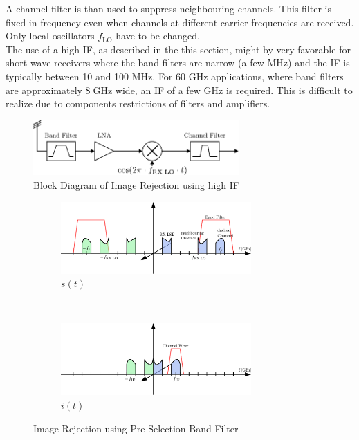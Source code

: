 A channel filter is than used to suppress neighbouring channels.
This filter is fixed in frequency even when channels at different carrier
frequencies are received. Only local oscillators $f_\text{LO}$ have to be
changed. \\

The use of a high \gls{IF}, as described in the this section, might
by very favorable for short wave receivers where the band filters
are narrow (a few MHz) and the \gls{IF} is typically between 10 and 100 MHz.
For 60 GHz applications, where band filters are approximately $8 \; \text{GHz}$
wide, an \gls{IF} of a few GHz is required.
This is difficult to realize due to components restrictions of filters
and amplifiers. \\

\begin{figure}[p]
  \centering
  \includegraphics[width=0.7\textwidth]{figures/rx_rf_0_bd}
  \caption{Block Diagram of Image Rejection using high \gls{IF}}
  \label{fig:rx_rf_0_bd}
\end{figure}

\begin{figure}[p]
  \centering
  \begin{subfigure}{\textwidth}
    \centering
    \includegraphics[width=0.8\textwidth]{figures/rx_rf_0_freq_s}
    \caption{$s(t)$}
    \label{fig:rx_rf_0_freq_s}
  \end{subfigure}
  \vspace{4ex} \\
  \begin{subfigure}{\textwidth}
    \centering
    \includegraphics[width=0.8\textwidth]{figures/rx_rf_0_freq_i}
    \caption{$i(t)$}
    \label{fig:rx_rf_0_freq_i}
  \end{subfigure}
  \caption{Image Rejection using Pre-Selection Band Filter}
  \label{fig:rx_rf_0_freq}
\end{figure}


